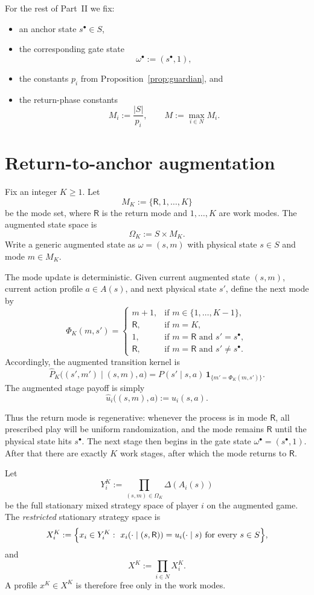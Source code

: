 \documentclass[11pt]{article}
\theoremstyle{definition}
\newcommand{\1}{\mathbf{1}}
\begin{document}
For the rest of Part~II we fix:
\begin{itemize}[leftmargin=2.4em]
\item an anchor state $s^\bullet\in S$,
\item the corresponding gate state
\[
\omega^\bullet:=(s^\bullet,1),
\]
\item the constants $p_i$ from Proposition~\ref{prop:guardian}, and
\item the return-phase constants
\[
M_i:=\frac{|S|}{p_i},
\qquad
M:=\max_{i\in N}M_i.
\]
\end{itemize}

\section{Return-to-anchor augmentation}\label{sec:augmentation}

Fix an integer $K\ge1$. Let
\[
M_K:=\{\mathsf R,1,\dots,K\}
\]
be the mode set, where $\mathsf R$ is the return mode and $1,\dots,K$ are work modes. The augmented state space is
\[
\Omega_K:=S\times M_K.
\]
Write a generic augmented state as $\omega=(s,m)$ with physical state $s\in S$ and mode $m\in M_K$.

The mode update is deterministic. Given current augmented state $(s,m)$, current action profile $a\in A(s)$, and next physical state $s'$, define the next mode by
\[
\Phi_K(m,s')=
\begin{cases}
m+1, & \text{if }m\in\{1,\dots,K-1\},\\[0.3em]
\mathsf R, & \text{if }m=K,\\[0.3em]
1, & \text{if }m=\mathsf R\text{ and }s'=s^\bullet,\\[0.3em]
\mathsf R, & \text{if }m=\mathsf R\text{ and }s'\neq s^\bullet.
\end{cases}
\]
Accordingly, the augmented transition kernel is
\[
\widehat P_K\bigl((s',m')\mid (s,m),a\bigr)
=
P(s'\mid s,a)\,\1_{\{m'=\Phi_K(m,s')\}}.
\]
The augmented stage payoff is simply
\[
\widehat u_i\bigl((s,m),a\bigr):=u_i(s,a).
\]

Thus the return mode is regenerative: whenever the process is in mode $\mathsf R$, all prescribed play will be uniform randomization, and the mode remains $\mathsf R$ until the physical state hits $s^\bullet$. The next stage then begins in the gate state $\omega^\bullet=(s^\bullet,1)$. After that there are exactly $K$ work stages, after which the mode returns to $\mathsf R$.

Let
\[
Y_i^K:=\prod_{(s,m)\in\Omega_K}\Delta(A_i(s))
\]
be the full stationary mixed strategy space of player $i$ on the augmented game. The \emph{restricted} stationary strategy space is
\[
X_i^K:=\Bigl\{x_i\in Y_i^K:\ x_i(\cdot\mid (s,\mathsf R))=u_i(\cdot\mid s)\text{ for every }s\in S\Bigr\},
\]
and
\[
X^K:=\prod_{i\in N}X_i^K.
\]
A profile $x^K\in X^K$ is therefore free only in the work modes.
\end{document}

